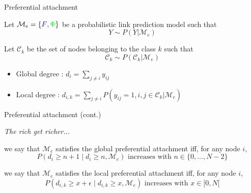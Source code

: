 \begin{frame}[c]{Preferential attachment}


    \begin{definition}[Degrees]
    Let $\mathcal{M}_e = \{ \textcolor{blue}{F}, \textcolor{green}{\Phi} \}$ be a probabilistic link prediction model such that 
    \[Y\sim P(Y|\mathcal{M}_e) \]

    Let $\mathcal{C}_k$ be the set of nodes belonging to the class $k$ such that
    \[\mathcal{C}_k\sim P(\mathcal{C}_k|\mathcal{M}_e) \]

    \begin{itemize}
    \item Global degree : $d_i  = \sum_{j\neq i} y_{ij}$
    \item  Local degree :  $d_{i,k}  = \sum_{j\neq i} P(y_{ij}=1, i,j\in \mathcal{C}_k | \mathcal{M}_e) $
    \end{itemize}
    \end{definition}





\end{frame}


\begin{frame}[c]{Preferential attachment (cont.)}

\emph{The rich get richer...}
\vspace{2em}

\begin{definition}
we say that $\mathcal{M}_e$ satisfies the global preferential attachment iff, for any node $i$, 
\[P(d_i \ge n+1 \mid d_i \ge n, \mathcal{M}_e) \textrm{ increases with } n \in \{0,..., N-2\} \]
\end{definition}

\begin{definition}
we say that  $\mathcal{M}_e$ satisfies the local preferential attachment iff, for any node $i$, 
\[P(d_{i,k} \ge x+\epsilon \mid d_{i,k} \ge x, \mathcal{M}_e) \textrm{ increases with } x \in [0,N[ \]
\end{definition}

\end{frame}

